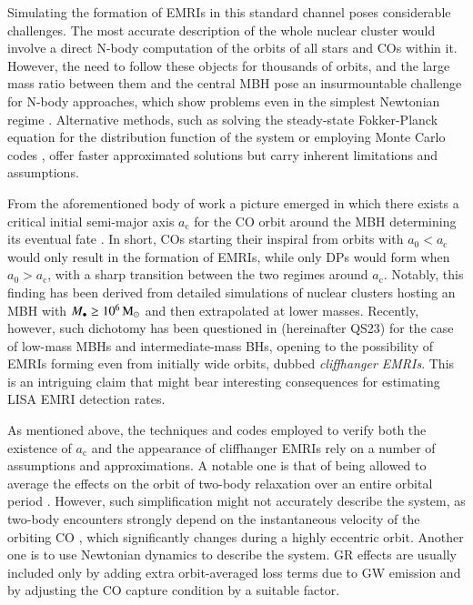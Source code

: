 \documentclass[desactivate]{aa}
\begin{document}
   Simulating the formation of EMRIs in this standard channel poses considerable challenges. The most accurate description of the whole nuclear cluster would involve a direct N-body computation of the orbits of all stars and COs within it. However, the need to follow these objects for thousands of orbits, and the large mass ratio between them and the central MBH pose an insurmountable challenge for N-body approaches, which show problems even in the simplest Newtonian regime \citep{2018LRR....21....4A}. Alternative methods, such as solving the steady-state Fokker-Planck equation for the distribution function of the system \citep[e.g.][]{2011CQGra..28i4017A,2016ApJ...820..129B,2017ApJ...848...10V,2022MNRAS.514.3270B,2024arXiv240607627K} or employing Monte Carlo codes \citep[e.g.][]{1971Ap&SS..13..284H,1998MNRAS.298.1239G,2000ApJ...540..969J,2001A&A...375..711F,2013ApJS..204...15P,2018ApJ...852...51F,zhangMonteCarloStellarDynamics2023a}, offer faster approximated solutions but carry inherent limitations and assumptions. 
   
   From the aforementioned body of work a picture emerged in which there exists a critical initial semi-major axis $a_\mathrm{c}$ for the CO orbit around the MBH determining its eventual fate \citep{2005ApJ...629..362H,2016ApJ...820..129B,2021MNRAS.501.5012R}. In short, COs starting their inspiral from orbits with $a_0 < a_\mathrm{c}$ would only result in the formation of EMRIs, while only DPs would form when $a_0 > a_\mathrm{c}$, with a sharp transition between the two regimes around $a_\mathrm{c}$. Notably, this finding has been derived from detailed simulations of nuclear clusters hosting an MBH with $M_\bullet \geq 10^6\, {\rm M}_\odot$ and then extrapolated at lower masses. 
   Recently, however, such dichotomy has been questioned in \citet{2023arXiv230413062Q} (hereinafter QS23) for the case of low-mass MBHs and intermediate-mass BHs, opening to the possibility of EMRIs forming even from initially wide orbits, dubbed \textit{cliffhanger EMRIs}. 
   This is an intriguing claim that might bear interesting consequences for estimating LISA EMRI detection rates. 

   As mentioned above, the techniques and codes employed to verify both the existence of $a_\mathrm{c}$ and the appearance of cliffhanger EMRIs rely on a number of assumptions and approximations. 
   A notable one is that of being allowed to average the effects on the orbit of two-body relaxation over an entire orbital period \citep[e.g.][]{1978ApJ...226.1087C,2005ApJ...629..362H,2023arXiv230413062Q}. However, such simplification might not accurately describe the system, as two-body encounters strongly depend on the instantaneous velocity of the orbiting CO \citep{2008gady.book.....B,2013degn.book.....M}, which significantly changes during a highly eccentric orbit. Another one is to use Newtonian dynamics to describe the system. GR effects are usually included only by adding extra orbit-averaged loss terms due to GW emission and by adjusting the CO capture condition by a suitable factor. 
    
\end{document}
